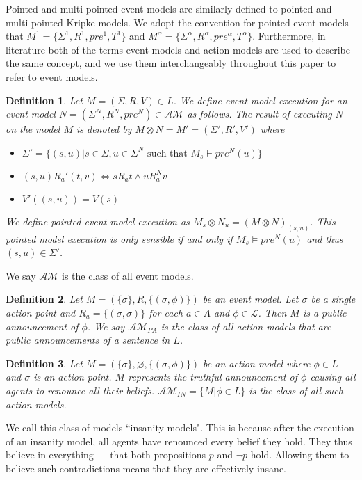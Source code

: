 \documentclass[12pt, a4paper, titlepage]{article}
\newtheorem{defn}{Definition}[subsection]
\numberwithin{equation}{section}
\newcommand{\eventClass}{\mathcal{AM}}
\newcommand{\insaneClass}{\eventClass_{IN}}
\newcommand{\publicAnnClass}{\eventClass_{PA}}
\begin{document}
Pointed and multi-pointed event models are similarly defined to pointed and multi-pointed Kripke
models.
We adopt the convention for pointed event models that $M^1 = \{\Sigma^1, R^1,
pre^1, T^1\}$ and $M^\alpha = \{\Sigma^\alpha,R^\alpha,pre^\alpha,T^\alpha\}$.
Furthermore, in literature both of the terms event models and action models are used to describe
the same concept, and we use them interchangeably throughout this paper to refer to event models.

\begin{defn} \label{evModelEx}
Let $M = (\Sigma, R, V) \in L$. We define event model execution for an event model $N = (\Sigma^N,
		R^N, pre^N) \in
\mathcal{AM}$ as follows.
The result of executing $N$ on the model $M$ is denoted by $M \otimes N = M' = (\Sigma', R', V')$ where
\begin{itemize}
	\item $\Sigma' = \{(s,u) | s \in \Sigma, u \in \Sigma^N \text{ such that } M_s \vdash pre^N(u)\}$
	\item $(s, u) R_a' (t, v) \iff s R_a t \land u R_a^N v$
	\item $V'((s,u)) = V(s)$
\end{itemize}
We define pointed event model execution as $M_s \otimes N_u = (M \otimes N)_{(s, u)}$.
This pointed model execution is only sensible if and only if $M_s \models pre^N(u)$ and thus $(s,u)
	\in \Sigma'$.
\end{defn}

We say $\eventClass$ is the class of all event models.

\begin{defn} \label{pub}
Let $M = (\{ \sigma \}, R, \{ (\sigma, \phi)\})$ be an event model.
Let $\sigma$ be a single action point and $R_a = \{(\sigma, \sigma)\}$ for each $a \in A$ and $\phi
\in \mathcal{L}$.
Then $M$ is a public announcement of $\phi$.
We say $\publicAnnClass$ is the class of all action models that
are public announcements of a sentence in $L$.
\end{defn}

\begin{defn} \label{insanity}
Let $M = (\{ \sigma \}, \varnothing, \{(\sigma, \phi)\}) $ be an action model
where $\phi \in L$ and $\sigma$ is an action point.
$M$ represents the truthful announcement of $\phi$ causing all agents to renounce all their beliefs.
$\insaneClass = \{M | \phi \in L\}$ is the class of all such action models.
\end{defn}
We call this class of models ``insanity models".
This is because after the execution of an insanity model, all agents have renounced every belief
they hold.
They thus believe in everything --- that both propositions $p$ and $\neg p$ hold.
Allowing them to believe such contradictions means that they are effectively insane.
\end{document}
